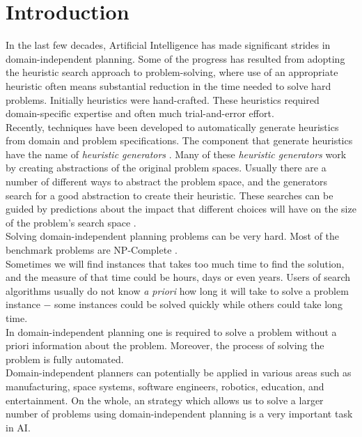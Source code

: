 \documentclass[a4paper,12pt]{article}
\begin{document}
\tableofcontents
\newpage

\section{Introduction}
In the last few decades, Artificial Intelligence has made significant strides in domain-independent planning. Some of the progress has resulted from adopting the heuristic search approach to problem-solving, where use of an appropriate heuristic often means substantial reduction in the time needed to solve hard problems. Initially heuristics were hand-crafted. These heuristics required domain-specific expertise and often much trial-and-error effort.\\

Recently, techniques \citep{haslum2007domain, edelkamp2007automated, nissim2011computing}  have been developed to automatically generate heuristics from domain and problem specifications. The component that generate heuristics have the name of \textit{heuristic generators} \citep{BarleySantiagoOver}.  Many of these \textit{heuristic generators} work by creating abstractions of the original problem spaces. Usually there are a number of different ways to abstract the problem space, and the generators search for a good abstraction to create their heuristic. These searches can be guided by predictions about the impact that different choices will have on the size of the problem's search space \citep{haslum2007domain}.\\

Solving domain-independent planning problems can be very hard. Most of the benchmark problems are NP-Complete \citep{helmert2006fast}.\\

Sometimes we will find instances that takes too much time to find the solution, and the measure of that time could be hours, days or even years. Users of search algorithms usually do not know \textit{a priori} how long it will take to solve a problem instance $-$ some instances could be solved quickly while others could take long time.\\

In domain-independent planning one is required to solve a problem without a priori information about the problem. Moreover, the process of solving the problem is fully automated.\\

Domain-independent planners can potentially be applied in various areas such as manufacturing, space systems, software engineers, robotics, education, and entertainment. On the whole, an strategy which allows us to solve a larger number of problems using domain-independent planning is a very important task in AI.\\
\end{document}
